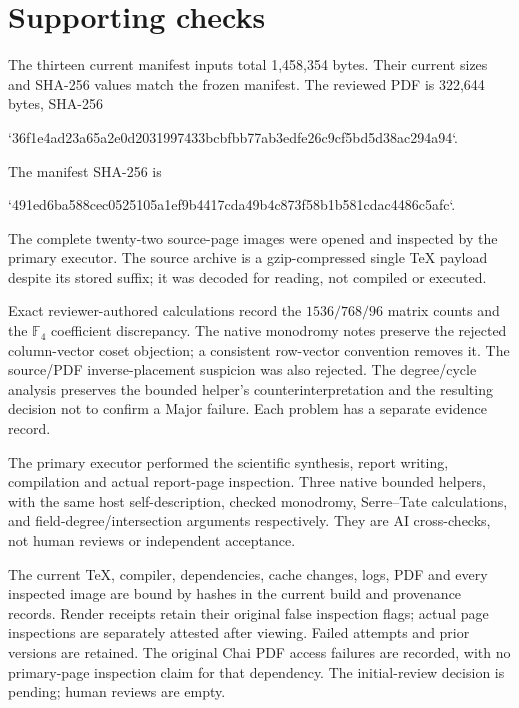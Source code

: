 \documentclass[10pt]{article}
\begin{document}
\section*{Supporting checks}
The thirteen current manifest inputs total 1,458,354 bytes. Their current sizes and SHA-256 values match the frozen manifest. The reviewed PDF is 322,644 bytes, SHA-256\par
`36f1e4ad23a65a2e0d2031997433bcbfbb77ab3edfe26c9cf5bd5d38ac294a94`.\par
The manifest SHA-256 is\par
`491ed6ba588cec0525105a1ef9b4417cda49b4c873f58b1b581cdac4486c5afc`.\par
The complete twenty-two source-page images were opened and inspected by the primary executor. The source archive is a gzip-compressed single TeX payload despite its stored suffix; it was decoded for reading, not compiled or executed.\par
Exact reviewer-authored calculations record the \(1536/768/96\) matrix counts and the \(\mathbb F_4\) coefficient discrepancy. The native monodromy notes preserve the rejected column-vector coset objection; a consistent row-vector convention removes it. The source/PDF inverse-placement suspicion was also rejected. The degree/cycle analysis preserves the bounded helper’s counterinterpretation and the resulting decision not to confirm a Major failure. Each problem has a separate evidence record.\par
The primary executor performed the scientific synthesis, report writing, compilation and actual report-page inspection. Three native bounded helpers, with the same host self-description, checked monodromy, Serre–Tate calculations, and field-degree/intersection arguments respectively. They are AI cross-checks, not human reviews or independent acceptance.\par
The current TeX, compiler, dependencies, cache changes, logs, PDF and every inspected image are bound by hashes in the current build and provenance records. Render receipts retain their original false inspection flags; actual page inspections are separately attested after viewing. Failed attempts and prior versions are retained. The original Chai PDF access failures are recorded, with no primary-page inspection claim for that dependency. The initial-review decision is pending; human reviews are empty.\par
\end{document}

